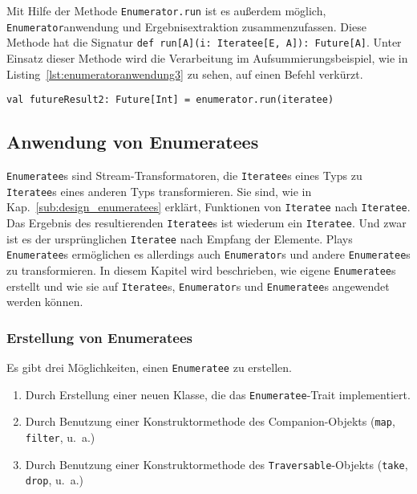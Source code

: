 Mit Hilfe der Methode \lstinline|Enumerator.run| ist es außerdem möglich, \lstinline|Enumerator|anwendung und Ergebnisextraktion zusammenzufassen.
Diese Methode hat die Signatur \lstinline[breaklines=true]|def run[A](i: Iteratee[E, A]): Future[A]|.
Unter Einsatz dieser Methode wird die Verarbeitung im Aufsummierungsbeispiel, wie in Listing~\ref{lst:enumeratoranwendung3} zu sehen, auf einen Befehl verkürzt.

\begin{lstlisting}[caption=Anwendung eines Enumerators mit gleichzeitiger Ergebnisextrahierung, label=lst:enumeratoranwendung3]
val futureResult2: Future[Int] = enumerator.run(iteratee)
\end{lstlisting}




\subsection{Anwendung von Enumeratees} %
\label{sub:enumeratees}

\lstinline|Enumeratee|s sind Stream-Transformatoren, die \lstinline|Iteratee|s eines Typs zu \lstinline|Iteratee|s eines anderen Typs transformieren.
Sie sind, wie in Kap.~\ref{sub:design_enumeratees} erklärt, Funktionen von \lstinline|Iteratee| nach \lstinline|Iteratee|.
Das Ergebnis des resultierenden \lstinline|Iteratee|s ist wiederum ein \lstinline|Iteratee|.
Und zwar ist es der ursprünglichen \lstinline|Iteratee| nach Empfang der Elemente.
Plays \lstinline|Enumeratee|s ermöglichen es allerdings auch \lstinline|Enumerator|s und andere \lstinline|Enumeratee|s zu transformieren.
In diesem Kapitel wird beschrieben, wie eigene \lstinline|Enumeratee|s erstellt und wie sie auf \lstinline|Iteratee|s, \lstinline|Enumerator|s und \lstinline|Enumeratee|s angewendet werden können.

\subsubsection{Erstellung von Enumeratees} %
\label{ssub:erstellung_von_enumeratees}

Es gibt drei Möglichkeiten, einen \lstinline|Enumeratee| zu erstellen.

\begin{enumerate}
  \item Durch Erstellung einer neuen Klasse, die das \lstinline|Enumeratee|-Trait implementiert.
  \item Durch Benutzung einer Konstruktormethode des Companion-Objekts (\lstinline|map|, \lstinline|filter|, u.~a.)
  \item Durch Benutzung einer Konstruktormethode des \lstinline|Traversable|-Objekts (\lstinline|take|, \lstinline|drop|, u.~a.)
\end{enumerate}

